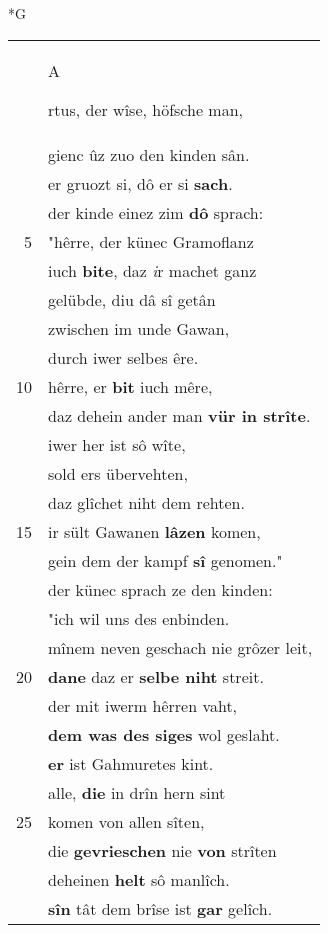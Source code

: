 \documentclass[8pt,a4paper,notitlepage]{article}
\begin{document}
\begin{table}[ht]
\begin{minipage}[t]{0.5\linewidth}
\small
\begin{center}*G
\end{center}
\begin{tabular}{rl}
 & \begin{large}A\end{large}rtus, der wîse, höfsche man,\\ 
 & gienc ûz zuo den kinden sân.\\ 
 & er gruozt si, dô er si \textbf{sach}.\\ 
 & der kinde einez zim \textbf{dô} sprach:\\ 
5 & "hêrre, der künec Gramoflanz\\ 
 & iuch \textbf{bite}, daz \textit{i}r machet ganz\\ 
 & gelübde, diu dâ sî getân\\ 
 & zwischen im unde Gawan,\\ 
 & durch iwer selbes êre.\\ 
10 & hêrre, er \textbf{bit} iuch mêre,\\ 
 & daz dehein ander man \textbf{vür in strîte}.\\ 
 & iwer her ist sô wîte,\\ 
 & sold ers übervehten,\\ 
 & daz glîchet niht dem rehten.\\ 
15 & ir sült Gawanen \textbf{lâzen} komen,\\ 
 & gein dem der kampf \textbf{sî} genomen."\\ 
 & der künec sprach ze den kinden:\\ 
 & "ich wil uns des enbinden.\\ 
 & mînem neven geschach nie grôzer leit,\\ 
20 & \textbf{dane} daz er \textbf{selbe niht} streit.\\ 
 & der mit iwerm hêrren vaht,\\ 
 & \textbf{dem was des siges} wol geslaht.\\ 
 & \textbf{er} ist Gahmuretes kint.\\ 
 & alle, \textbf{die} in drîn hern sint\\ 
25 & komen von allen sîten,\\ 
 & die \textbf{gevrieschen} nie \textbf{von} strîten\\ 
 & deheinen \textbf{helt} sô manlîch.\\ 
 & \textbf{sîn} tât dem brîse ist \textbf{gar} gelîch.\\ 

\end{tabular}
\end{minipage}
\end{table}
\end{document}
